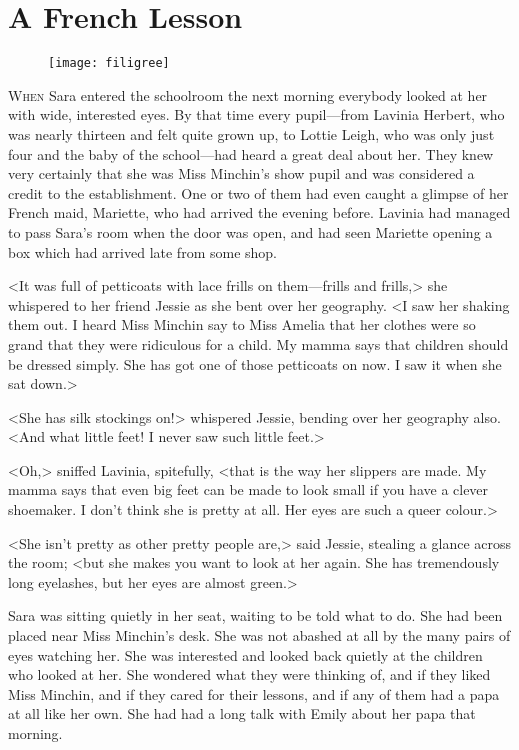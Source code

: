 \chapter{A French Lesson}

\begin{figure}[t!]
\centering
\texttt{[image: filigree]}
\end{figure}

\lettrine[lines=5]{W}{hen} Sara entered the schoolroom the next morning everybody looked at her with wide, interested eyes. By that time every pupil—from Lavinia Herbert, who was nearly thirteen and felt quite grown up, to Lottie Leigh, who was only just four and the baby of the school—had heard a great deal about her. They knew very certainly that she was Miss Minchin's show pupil and was considered a credit to the establishment. One or two of them had even caught a glimpse of her French maid, Mariette, who had arrived the evening before. Lavinia had managed to pass Sara's room when the door was open, and had seen Mariette opening a box which had arrived late from some shop.

<It was full of petticoats with lace frills on them—frills and frills,> she whispered to her friend Jessie as she bent over her geography. <I saw her shaking them out. I heard Miss Minchin say to Miss Amelia that her clothes were so grand that they were ridiculous for a child. My mamma says that children should be dressed simply. She has got one of those petticoats on now. I saw it when she sat down.>

<She has silk stockings on!> whispered Jessie, bending over her geography also. <And what little feet! I never saw such little feet.>

<Oh,> sniffed Lavinia, spitefully, <that is the way her slippers are made. My mamma says that even big feet can be made to look small if you have a clever shoemaker. I don't think she is pretty at all. Her eyes are such a queer colour.>

<She isn't pretty as other pretty people are,> said Jessie, stealing a glance across the room; <but she makes you want to look at her again. She has tremendously long eyelashes, but her eyes are almost green.>

Sara was sitting quietly in her seat, waiting to be told what to do. She had been placed near Miss Minchin's desk. She was not abashed at all by the many pairs of eyes watching her. She was interested and looked back quietly at the children who looked at her. She wondered what they were thinking of, and if they liked Miss Minchin, and if they cared for their lessons, and if any of them had a papa at all like her own. She had had a long talk with Emily about her papa that morning.

